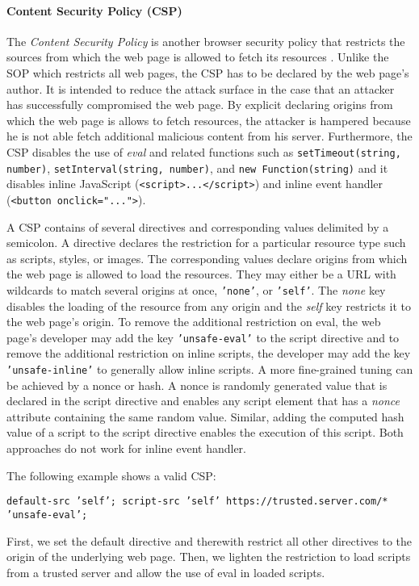 \paragraph{Content Security Policy (CSP)}

	The \textit{Content Security Policy} is another browser security policy that restricts the sources from which the web page is allowed to fetch its resources \cite{w3cContentSecurityPolicySpecification}. Unlike the SOP which restricts all web pages, the CSP has to be declared by the web page's author. It is intended to reduce the attack surface in the case that an attacker has successfully compromised the web page. By explicit declaring origins from which the web page is allows to fetch resources, the attacker is hampered because he is not able fetch additional malicious content from his server. Furthermore, the CSP disables the use of \textit{eval} and related functions such as \texttt{setTimeout(string, number)}, \texttt{setInterval(string, number)}, and \texttt{new Function(string)} and it disables inline JavaScript (\texttt{<script>...</script>}) and inline event handler (\texttt{<button onclick="...">}).
	
	A CSP contains of several directives and corresponding values delimited by a semicolon. A directive declares the restriction for a particular resource type such as scripts, styles, or images. The corresponding values declare origins from which the web page is allowed to load the resources. They may either be a URL with wildcards to match several origins at once, \texttt{'none'}, or \texttt{'self'}. The \textit{none} key disables the loading of the resource from any origin and the \textit{self} key restricts it to the web page's origin. To remove the additional restriction on eval, the web page's developer may add the key \texttt{'unsafe-eval'} to the script directive and to remove the additional restriction on inline scripts, the developer may add the key \texttt{'unsafe-inline'} to generally allow inline scripts. A more fine-grained tuning can be achieved by a nonce or hash. A nonce is randomly generated value that is declared in the script directive and enables any script element that has a \textit{nonce} attribute containing the same random value. Similar, adding the computed hash value of a script to the script directive enables the execution of this script. Both approaches do not work for inline event handler.
	
	The following example shows a valid CSP:
	\begin{center}
		\texttt{default-src 'self'; script-src 'self' https://trusted.server.com/* 'unsafe-eval';}
	\end{center}
	First, we set the default directive and therewith restrict all other directives to the origin of the underlying web page. Then, we lighten the restriction to load scripts from a trusted server and allow the use of eval in loaded scripts.


